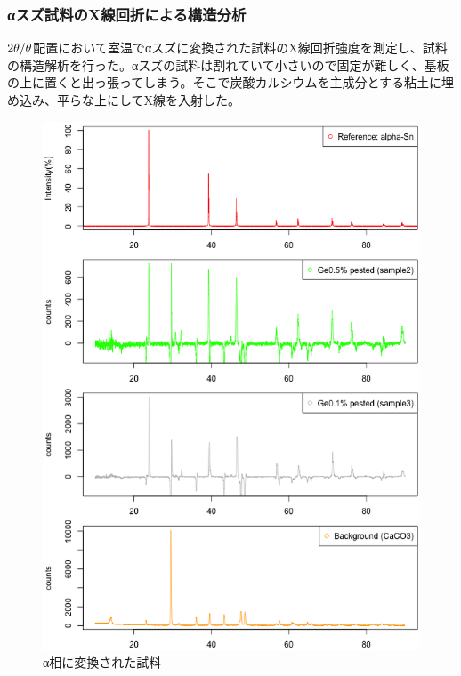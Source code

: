\subsubsection{αスズ試料のX線回折による構造分析}
$\rm 2\theta/\theta$配置において室温でαスズに変換された試料のX線回折強度を測定し、試料の構造解析を行った。αスズの試料は割れていて小さいので固定が難しく、基板の上に置くと出っ張ってしまう。そこで炭酸カルシウムを主成分とする粘土に埋め込み、平らな上にしてX線を入射した。

\begin{figure}[!h]
  \begin{center}
  \includegraphics[width=0.8\hsize]{results_discussions/intensity_pested_samples.eps}
  \end{center}
  \caption{α相に変換された試料}
  \label{fig:intensity_pested_samples}
\end{figure}

